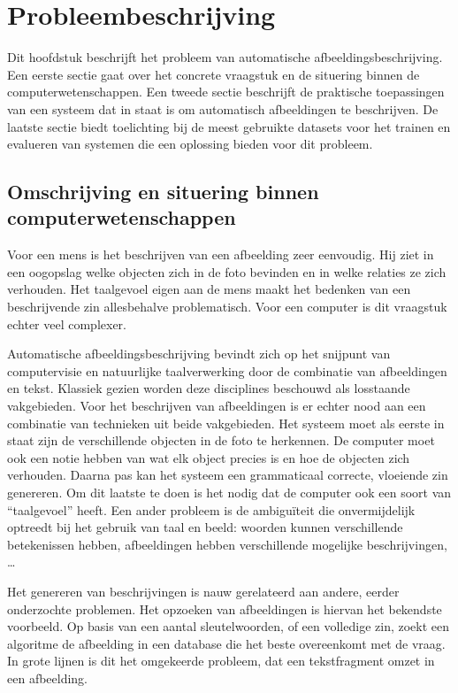 \chapter{Probleembeschrijving}
\label{chap:Probleembeschrijving}
Dit hoofdstuk beschrijft het probleem van automatische afbeeldingsbeschrijving. Een eerste sectie gaat over het concrete vraagstuk en de situering binnen de computerwetenschappen. Een tweede sectie beschrijft de praktische toepassingen van een systeem dat in staat is om automatisch afbeeldingen te beschrijven. De laatste sectie biedt toelichting bij de meest gebruikte datasets voor het trainen en evalueren van systemen die een oplossing bieden voor dit probleem.

\section{Omschrijving en situering binnen computerwetenschappen}
\label{sec:Omschrijving en situering}
Voor een mens is het beschrijven van een afbeelding zeer eenvoudig. Hij ziet in een oogopslag welke objecten zich in de foto bevinden en in welke relaties ze zich verhouden. Het taalgevoel eigen aan de mens maakt het bedenken van een beschrijvende zin allesbehalve problematisch.
Voor een computer is dit vraagstuk echter veel complexer.

Automatische afbeeldingsbeschrijving bevindt zich op het snijpunt van computervisie en natuurlijke taalverwerking door de combinatie van afbeeldingen en tekst. Klassiek gezien worden deze disciplines beschouwd als losstaande vakgebieden. Voor het beschrijven van afbeeldingen is er echter nood aan een combinatie van technieken uit beide vakgebieden. Het systeem moet als eerste in staat zijn de verschillende objecten in de foto te herkennen. De computer moet ook een notie hebben van wat elk object precies is en hoe de objecten zich verhouden. Daarna pas kan het systeem een grammaticaal correcte, vloeiende zin genereren. Om dit laatste te doen is het nodig dat de computer ook een soort van ``taalgevoel'' heeft. Een ander probleem is de ambigu\"iteit die onvermijdelijk optreedt bij het gebruik van taal en beeld: woorden kunnen verschillende betekenissen hebben, afbeeldingen hebben verschillende mogelijke beschrijvingen, \ldots

Het genereren van beschrijvingen is nauw gerelateerd aan andere, eerder onderzochte problemen. Het opzoeken van afbeeldingen is hiervan het bekendste voorbeeld. Op basis van een aantal sleutelwoorden, of een volledige zin, zoekt een algoritme de afbeelding in een database die het beste overeenkomt met de vraag. In grote lijnen is dit het omgekeerde probleem, dat een tekstfragment omzet in een afbeelding.

